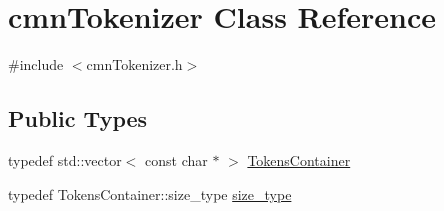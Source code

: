 \hypertarget{classcmn_tokenizer}{\section{cmn\-Tokenizer Class Reference}
\label{classcmn_tokenizer}
}


{\ttfamily \#include $<$cmn\-Tokenizer.\-h$>$}

\subsection*{Public Types}
\begin{DoxyCompactItemize}
\item 
typedef std\-::vector$<$ const char $\ast$ $>$ \hyperlink{classcmn_tokenizer_a6f2e13cc6f1f02a1692febd80eb7c0e2}{Tokens\-Container}
\item 
typedef Tokens\-Container\-::size\-\_\-type \hyperlink{classcmn_tokenizer_aa1b3819de936a3639e8ef5841f7fe762}{size\-\_\-type}
\end{DoxyCompactItemize}
